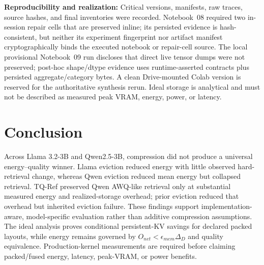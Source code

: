 \documentclass[conference]{IEEEtran}
\begin{document}
\textbf{Reproducibility and realization:} Critical versions, manifests, raw traces, source hashes, and final inventories were recorded. Notebook~08 required two in-session repair cells that are preserved inline; its persisted evidence is hash-consistent, but neither its experiment fingerprint nor artifact manifest cryptographically binds the executed notebook or repair-cell source. The local provisional Notebook~09 run discloses that direct live tensor dumps were not preserved; post-hoc shape/dtype evidence uses runtime-asserted contracts plus persisted aggregate/category bytes. A clean Drive-mounted Colab version is reserved for the authoritative synthesis rerun. Ideal storage is analytical and must not be described as measured peak VRAM, energy, power, or latency.


\section{Conclusion}

Across Llama 3.2-3B and Qwen2.5-3B, compression did not produce a universal energy--quality winner. Llama eviction reduced energy with little observed hard-retrieval change, whereas Qwen eviction reduced mean energy but collapsed retrieval. TQ-Ref preserved Qwen AWQ-like retrieval only at substantial measured energy and realized-storage overhead; prior eviction reduced that overhead but inherited eviction failure. These findings support implementation-aware, model-specific evaluation rather than additive compression assumptions. The ideal analysis proves conditional persistent-KV savings for declared packed layouts, while energy remains governed by $O_{net}<\epsilon_{mem}\Delta_D$ and quality equivalence. Production-kernel measurements are required before claiming packed/fused energy, latency, peak-VRAM, or power benefits.




\end{document}
